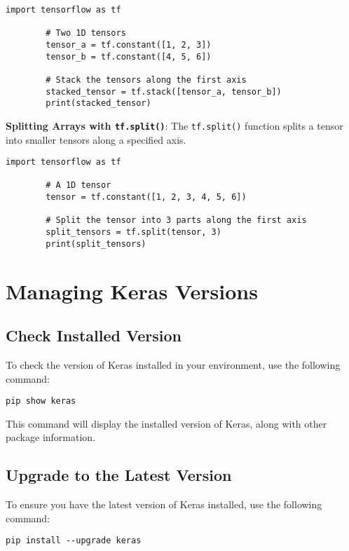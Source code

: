 	\begin{lstlisting}[caption={Stacking Arrays}, label={code:stack}, style=pythonstyle]
		import tensorflow as tf
		
		# Two 1D tensors
		tensor_a = tf.constant([1, 2, 3])
		tensor_b = tf.constant([4, 5, 6])
		
		# Stack the tensors along the first axis
		stacked_tensor = tf.stack([tensor_a, tensor_b])
		print(stacked_tensor)
	\end{lstlisting}
	
	\textbf{Splitting Arrays with \texttt{tf.split()}}: The \texttt{tf.split()} function splits a tensor into smaller tensors along a specified axis.
	
	\begin{lstlisting}[caption={Splitting Arrays}, label={code:split}, style=pythonstyle]
		import tensorflow as tf
		
		# A 1D tensor
		tensor = tf.constant([1, 2, 3, 4, 5, 6])
		
		# Split the tensor into 3 parts along the first axis
		split_tensors = tf.split(tensor, 3)
		print(split_tensors)
	\end{lstlisting}
	
	\section{Managing Keras Versions}
	
	\subsection{Check Installed Version}
	To check the version of Keras installed in your environment, use the following command:
	
	\begin{lstlisting}[caption={Check Installed Keras Version}, label={code:check-keras}, style=pythonstyle]
		pip show keras
	\end{lstlisting}
	
	This command will display the installed version of Keras, along with other package information.
	
	\subsection{Upgrade to the Latest Version}
	To ensure you have the latest version of Keras installed, use the following command:
	
	\begin{lstlisting}[caption={Upgrade Keras}, label={code:upgrade-keras}, style=pythonstyle]
		pip install --upgrade keras
	\end{lstlisting}
	
